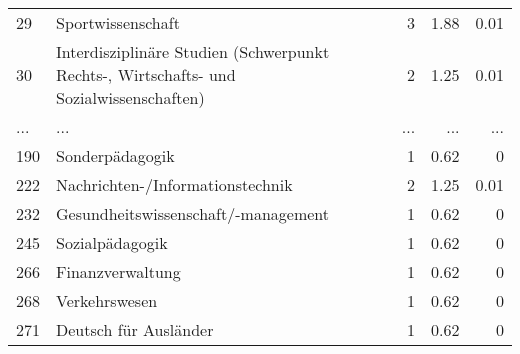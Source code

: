 \begin{longtable}{lXrrr}
        29 & \multicolumn{1}{X}{Sportwissenschaft} & %
          \num{3} &
          \num[round-mode=places,round-precision=2]{1.88} &
          \num[round-mode=places,round-precision=2]{0.01} \\
        30 & \multicolumn{1}{X}{Interdisziplinäre Studien (Schwerpunkt Rechts-, Wirtschafts- und Sozialwissenschaften)} & %
          \num{2} &
          \num[round-mode=places,round-precision=2]{1.25} &
          \num[round-mode=places,round-precision=2]{0.01} \\
       ... & ... & ... & ... & ... \\
        190 & \multicolumn{1}{X}{Sonderpädagogik} & %
          \num{1} &
          \num[round-mode=places,round-precision=2]{0.62} &
          \num[round-mode=places,round-precision=2]{0} \\

        222 & \multicolumn{1}{X}{Nachrichten-/Informationstechnik} & %
          \num{2} &
          \num[round-mode=places,round-precision=2]{1.25} &
          \num[round-mode=places,round-precision=2]{0.01} \\

        232 & \multicolumn{1}{X}{Gesundheitswissenschaft/-management} & %
          \num{1} &
          \num[round-mode=places,round-precision=2]{0.62} &
          \num[round-mode=places,round-precision=2]{0} \\

        245 & \multicolumn{1}{X}{Sozialpädagogik} & %
          \num{1} &
          \num[round-mode=places,round-precision=2]{0.62} &
          \num[round-mode=places,round-precision=2]{0} \\

        266 & \multicolumn{1}{X}{Finanzverwaltung} & %
          \num{1} &
          \num[round-mode=places,round-precision=2]{0.62} &
          \num[round-mode=places,round-precision=2]{0} \\

        268 & \multicolumn{1}{X}{Verkehrswesen} & %
          \num{1} &
          \num[round-mode=places,round-precision=2]{0.62} &
          \num[round-mode=places,round-precision=2]{0} \\

        271 & \multicolumn{1}{X}{Deutsch für Ausländer} & %
          \num{1} &
          \num[round-mode=places,round-precision=2]{0.62} &
          \num[round-mode=places,round-precision=2]{0} \\


\end{longtable}
